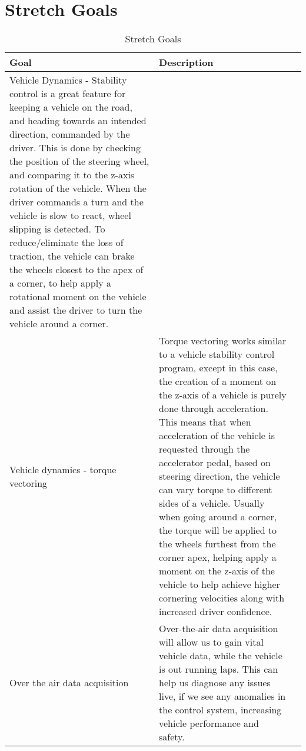 \documentclass{article}
\begin{document}
\section{Stretch Goals}

\begin{table}[hp]
\caption{Stretch Goals} \label{TblStretchGoals}
\begin{tabularx}{\textwidth}{llX}
\toprule
\textbf{Goal} & \textbf{Description}\\
\midrule
Vehicle Dynamics - Stability control is a great feature for keeping a 
vehicle on the road, and heading towards an intended direction, commanded 
by the driver. This is done by checking the position of the steering wheel, 
and comparing it to the z-axis rotation of the vehicle. When the driver 
commands a turn and the vehicle is slow to react, wheel slipping is detected. 
To reduce/eliminate the loss of traction, the vehicle can brake the wheels 
closest to the apex of a corner, to help apply a rotational moment on the 
vehicle and assist the driver to turn the vehicle around a corner. \\
Vehicle dynamics - torque vectoring & Torque vectoring works similar to a 
vehicle stability control program, except in this case, the creation of a 
moment on the z-axis of a vehicle is purely done through acceleration. This 
means that when acceleration of the vehicle is requested through the accelerator 
pedal, based on steering direction, the vehicle can vary torque to different sides 
of a vehicle. Usually when going around a corner, the torque will be applied to 
the wheels furthest from the corner apex, helping apply a moment on the z-axis of 
the vehicle to help achieve higher cornering velocities along with increased driver 
confidence.\\
Over the air data acquisition & Over-the-air data acquisition will allow us to 
gain vital vehicle data, while the vehicle is out running laps. This can help 
us diagnose any issues live, if we see any anomalies in the control system, 
increasing vehicle performance and safety.\\
\bottomrule
\end{tabularx}
\end{table}
\end{document}
